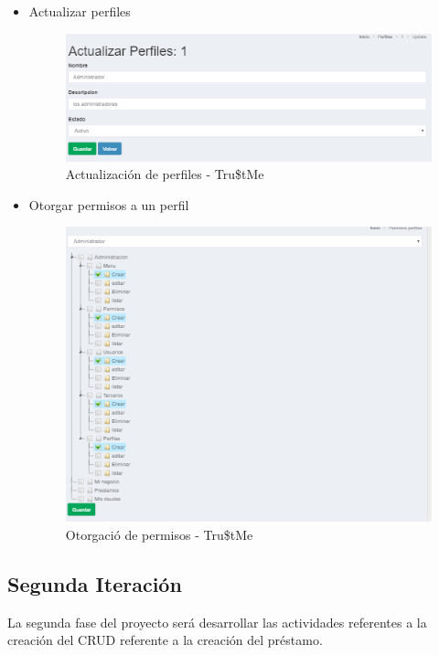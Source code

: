 {{\begin{itemize}
		\item Actualizar perfiles
		\begin{figure}[H]
			\centering
			\includegraphics[width=1\linewidth]{development/actualizarperfiles.png}
			\caption{Actualización de perfiles - Tru\$tMe}
		\end{figure}
	
		\item Otorgar permisos a un perfil
		\begin{figure}[H]
			\centering
			\includegraphics[width=1\linewidth]{development/otorgarpermisos.png}
			\caption{Otorgació de permisos - Tru\$tMe}
		\end{figure}
		
		 
	\end{itemize}
		

		
	}

		\subsection{Segunda Iteración}
		{La segunda fase del proyecto será desarrollar las actividades referentes a la creación del CRUD referente a la creación del préstamo.\\
			
}}
